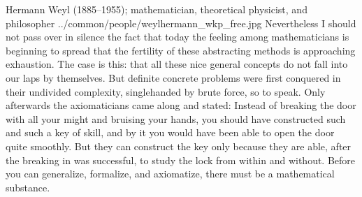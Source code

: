 
\qboxnpq
  {
    Hermann Weyl (1885--1955); mathematician, theoretical physicist, and philosopher
    \footnotemark
  }
  {../common/people/weylhermann_wkp_free.jpg}
  {Nevertheless I should not pass over in silence the fact that today the 
   feeling among mathematicians is beginning to spread that the fertility 
   of these abstracting methods is approaching exhaustion. 
   The case is this: that all these nice general concepts do not fall into our laps by themselves. 
   But definite concrete problems were first conquered in their undivided complexity, 
   singlehanded by brute force, so to speak. Only afterwards the axiomaticians came along and stated: 
   Instead of breaking the door with all your might and bruising your hands, 
   you should have constructed such and such a key of skill, 
   and by it you would have been able to open the door quite smoothly. 
   But they can construct the key only because they are able, after the breaking in was successful, 
   to study the lock from within and without. 
   Before you can generalize, formalize, and axiomatize, there must be a mathematical substance.}

